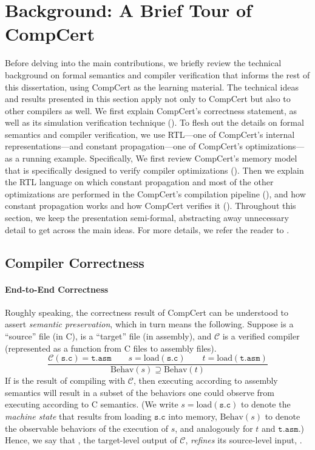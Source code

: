 \section{Background: A Brief Tour of CompCert}
\label{sec:background}

Before delving into the main contributions, we briefly review the technical background on formal
semantics and compiler verification that informs the rest of this dissertation, using CompCert as
the learning material.  The technical ideas and results presented in this section apply not only to
CompCert but also to other compilers as well.  We first explain CompCert's correctness statement, as
well as its simulation verification technique ().  To flesh out the
details on formal semantics and compiler verification, we use RTL---one of CompCert's internal
representations---and constant propagation---one of CompCert's optimizations---as a running example.
Specifically, We first review CompCert's memory model that is specifically designed to verify
compiler optimizations ().  Then we explain the RTL language on which
constant propagation and most of the other optimizations are performed in the CompCert's compilation
pipeline (), and how constant propagation works and how CompCert verifies
it ().  Throughout this section, we keep the presentation
semi-formal, abstracting away unnecessary detail to get across the main ideas.  For more details, we
refer the reader to \cite{compcert, compcert-memory-model}.


\subsection{Compiler Correctness}
\label{sec:background:correctness}

\paragraph{End-to-End Correctness}

Roughly speaking, the correctness result of CompCert can be understood to assert \emph{semantic
  preservation}, which in turn means the following.  Suppose  is a ``source'' file (in C),
 is a ``target'' file (in assembly), and $\mathcal{C}$ is a verified compiler
(represented as a function from C files to assembly files).
\[
\frac{
\mathcal{C}(\mathtt{s.c}) = \mathtt{t.asm} \qquad
s = \mathrm{load}(\mathtt{s.c})\qquad
t = \mathrm{load}(\mathtt{t.asm})}
{\mathrm{Behav}(s) \supseteq \mathrm{Behav}(t)}
\]
If  is the result of compiling  with $\mathcal{C}$, then executing
 according to assembly semantics will result in a subset of the behaviors one could
observe from executing  according to C semantics.  (We write
$s = \mathrm{load}(\mathtt{s.c})$ to denote the \emph{machine state} that results from loading
$\mathtt{s.c}$ into memory, $\mathrm{Behav}(s)$ to denote the observable behaviors of the execution
of $s$, and analogously for $t$ and $\mathtt{t.asm}$.)  Hence, we say that , the
target-level output of $\mathcal{C}$, \emph{refines} its source-level input, .

